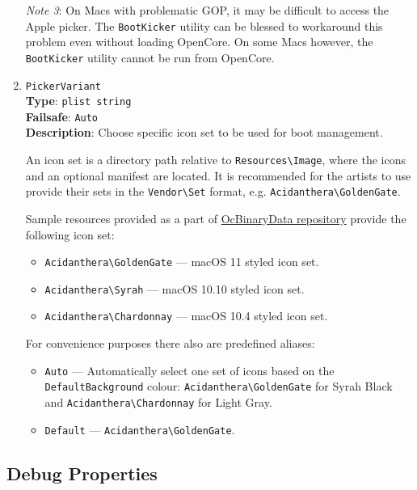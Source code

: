 \documentclass[]{article}
\providecommand{\tightlist}{%
  \setlength{\itemsep}{0pt}\setlength{\parskip}{0pt}}
\begin{document}
\begin{enumerate}
  \emph{Note 3}: On Macs with problematic GOP, it may be difficult to access the Apple picker.
  The \texttt{BootKicker} utility can be blessed to workaround this problem even without loading
  OpenCore. On some Macs however, the \texttt{BootKicker} utility cannot be run from OpenCore.

\item
  \texttt{PickerVariant}\\
  \textbf{Type}: \texttt{plist\ string}\\
  \textbf{Failsafe}: \texttt{Auto}\\
  \textbf{Description}: Choose specific icon set to be used for boot management.

  An icon set is a directory path relative to \texttt{Resources\textbackslash Image},
  where the icons and an optional manifest are located. It is recommended for
  the artists to use provide their sets in the \texttt{Vendor\textbackslash Set} format,
  e.g. \texttt{Acidanthera\textbackslash GoldenGate}.

  Sample resources provided as a part of
  \href{https://github.com/acidanthera/OcBinaryData}{OcBinaryData repository}
  provide the following icon set:
  \begin{itemize}
    \tightlist
    \item \texttt{Acidanthera\textbackslash GoldenGate} --- macOS 11 styled icon set.
    \item \texttt{Acidanthera\textbackslash Syrah} --- macOS 10.10 styled icon set.
    \item \texttt{Acidanthera\textbackslash Chardonnay} --- macOS 10.4 styled icon set.
  \end{itemize}

  For convenience purposes there also are predefined aliases:
  \begin{itemize}
    \tightlist
    \item \texttt{Auto} --- Automatically select one set of icons based on the \texttt{DefaultBackground}
      colour: \texttt{Acidanthera\textbackslash GoldenGate} for Syrah Black and
      \texttt{Acidanthera\textbackslash Chardonnay} for Light Gray.
    \item \texttt{Default} --- \texttt{Acidanthera\textbackslash GoldenGate}.
  \end{itemize}

\end{enumerate}

\subsection{Debug Properties}\label{miscdebugprops}
\end{document}
